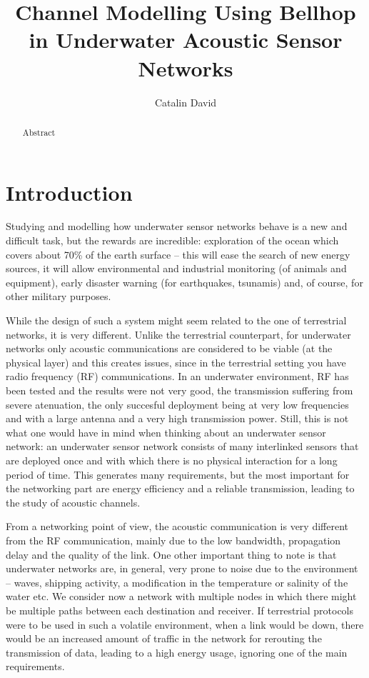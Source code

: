 \documentclass[a4paper]{IEEEtran}
\begin{document}
\author{Catalin David}
\title{Channel Modelling Using Bellhop in Underwater Acoustic Sensor Networks}

\maketitle
\begin{abstract}
Abstract
\end{abstract}

\section{Introduction}
Studying and modelling how underwater sensor networks behave is a new and difficult task, but the rewards are incredible: exploration of the ocean which covers about 70\% of the earth surface -- this will ease the search of new energy sources, it will allow environmental and industrial monitoring (of animals and equipment), early disaster warning (for earthquakes, tsunamis) and, of course, for other military purposes.

While the design of such a system might seem related to the one of terrestrial networks, it is very different. Unlike the terrestrial counterpart, for underwater networks only acoustic communications are considered to be viable (at the physical layer) and this creates issues, since in the terrestrial setting you have radio frequency (RF) communications. In an underwater environment, RF has been tested and the results were not very good, the transmission suffering from severe atenuation, the only succesful deployment being at very low frequencies and with a large antenna and a very high transmission power. Still, this is not what one would have in mind when thinking about an underwater sensor network: an underwater sensor network consists of many interlinked sensors that are deployed once and with which there is no physical interaction for a long period of time. This generates many requirements, but the most important for the networking part are energy efficiency and a reliable transmission, leading to the study of acoustic channels.

From a networking point of view, the acoustic communication is very different from the RF communication, mainly due to the low bandwidth, propagation delay and the quality of the link. One other important thing to note is that underwater networks are, in general, very prone to noise due to the environment -- waves, shipping activity, a modification in the temperature or salinity of the water etc. We consider now a network with multiple nodes in which there might be multiple paths between each destination and receiver. If terrestrial protocols were to be used in such a volatile environment, when a link would be down, there would be an increased amount of traffic in the network for rerouting the transmission of data, leading to a high energy usage, ignoring one of the main requirements.
\end{document}
